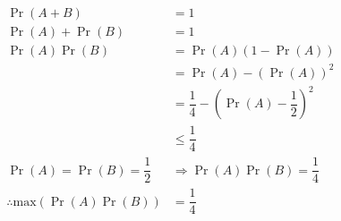 \begin{align}
\Pr(A+B) &= 1\\
\Pr(A) + \Pr(B) &= 1 \\
\Pr(A)\Pr(B) &= \Pr(A) (1 - \Pr(A))\\
&= \Pr(A) - (\Pr(A))^2\\
&= \dfrac{1}{4} - \left( \Pr(A) - \dfrac{1}{2} \right)^2 \\
&\leq \dfrac{1}{4}\\
\Pr(A) = \Pr(B) = \dfrac{1}{2} &\Rightarrow \Pr(A)\Pr(B) = \dfrac{1}{4}\\ \therefore \text{max}(\Pr(A)\Pr(B)) &= \dfrac{1}{4}
\end{align}